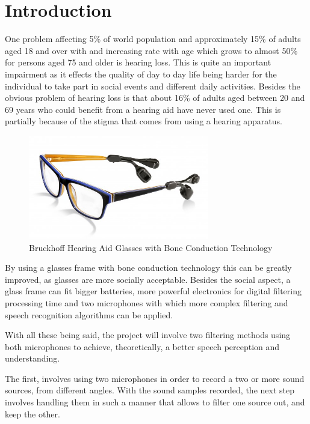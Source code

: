 \chapter{Introduction}\label{ch:introduction}
One problem affecting 5\% of world population and approximately 15\% of adults aged 18 and over with and 
increasing rate with age which grows to almost 50\% for persons aged 75 and older is hearing loss.
This is quite an important impairment as it effects the quality of day to day life being harder for the 
individual to take part in social events and different daily activities. Besides the obvious problem of 
hearing loss is that about 16\% of adults aged between 20 and 69 years who could benefit from a hearing aid 
have never used one. This is partially because of the stigma that comes from using a hearing apparatus.
\cite{WHO}
 
 \begin{figure}[htp]
	\centering
	\includegraphics[width = 0.7\textwidth]{Illustrations/glasses_with_hearing_stuff.jpg}
	\caption{Bruckhoff Hearing Aid Glasses with Bone Conduction Technology\cite{GLASSES}}
	\label{fig:BoneConductionGlasses}
\end{figure}
 
By using a glasses frame with bone conduction technology this can be greatly improved, as glasses are more 
socially acceptable. Besides the social aspect, a glass frame can fit bigger batteries, more powerful 
electronics for digital filtering processing time and two microphones with which more complex filtering and 
speech recognition algorithms can be applied.

With all these being said, the project will involve two filtering methods using both microphones to achieve, 
theoretically, a better speech perception and understanding.

The first, involves using two microphones in order to record a two or 
more sound sources, from different angles.
With the sound samples recorded, the next step involves handling them 
in such a manner that allows to filter one source out, and keep the other.

